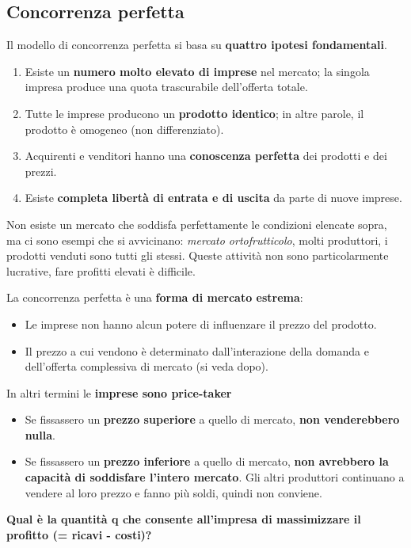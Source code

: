 \documentclass[../main.tex]{subfiles}
\begin{document}
\subsection{Concorrenza perfetta}

Il modello di concorrenza perfetta si basa su \textbf{quattro ipotesi fondamentali}.
\begin{enumerate}
    \item Esiste un \textbf{numero molto elevato di imprese} nel mercato; la singola impresa produce una quota trascurabile dell'offerta totale.
    \item Tutte le imprese producono un \textbf{prodotto identico}; in altre parole, il prodotto è omogeneo (non differenziato).
    \item Acquirenti e venditori hanno una \textbf{conoscenza perfetta} dei prodotti e dei prezzi.
    \item Esiste \textbf{completa libertà di entrata e di uscita} da parte di nuove imprese.
\end{enumerate}

Non esiste un mercato che soddisfa perfettamente le condizioni elencate sopra, ma ci sono esempi che si avvicinano: \emph{mercato ortofrutticolo}, molti produttori, i prodotti venduti sono tutti gli stessi. Queste attività non sono particolarmente lucrative, fare profitti elevati è difficile.

La concorrenza perfetta è una \textbf{forma di mercato estrema}:
\begin{itemize}
    \item Le imprese non hanno alcun potere di influenzare il prezzo del prodotto.
    \item Il prezzo a cui vendono è determinato dall'interazione della domanda e dell'offerta complessiva di mercato (si veda dopo).
\end{itemize}

In altri termini le \textbf{imprese sono price-taker}
\begin{itemize}
    \item Se fissassero un \textbf{prezzo superiore} a quello di mercato, \textbf{non venderebbero nulla}.
    \item Se fissassero un \textbf{prezzo inferiore} a quello di mercato, \textbf{non avrebbero la capacità di soddisfare l'intero mercato}. Gli altri produttori continuano a vendere al loro prezzo e fanno più soldi, quindi non conviene.
\end{itemize}

\textbf{Qual è la quantità q che consente all'impresa di massimizzare il profitto (= ricavi - costi)?}
\end{document}
